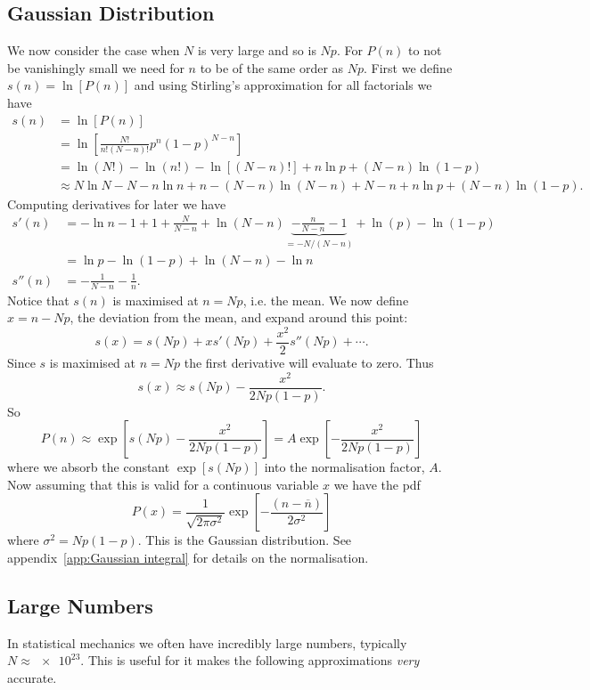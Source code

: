 \documentclass[a4paper]{article}
\newcommand{\mean}[1]{\overline{#1}}
\begin{document}
    \subsection{Gaussian Distribution}
    We now consider the case when \(N\) is very large and so is \(Np\).
    For \(P(n)\) to not be vanishingly small we need for \(n\) to be of the same order as \(Np\).
    First we define \(s(n) = \ln[P(n)]\) and using Stirling's approximation for all factorials we have
    \begin{align*}
        s(n) &= \ln[P(n)]\\
        &= \ln\left[\frac{N!}{n!(N - n)!}p^n(1 - p)^{N-n}\right]\\
        &= \ln(N!) - \ln(n!) - \ln[(N - n)!] + n\ln p + (N - n)\ln(1 - p)\\
        &\approx N\ln N - N - n\ln n + n - (N - n)\ln(N - n) + N - n + n\ln p + (N - n)\ln(1 - p).
    \end{align*}
    Computing derivatives for later we have
    \begin{align*}
        s'(n) &= -\ln n - 1 + 1 + \frac{N}{N - n} + \ln(N - n) \underbrace{- \frac{n}{N - n} - 1}_{= - N/(N-n)} + \ln(p) - \ln(1 - p)\\
        &= \ln p - \ln(1 - p) + \ln(N - n) - \ln n\\
        s''(n) &= -\frac{1}{N - n} - \frac{1}{n}.
    \end{align*}
    Notice that \(s(n)\) is maximised at \(n = Np\), i.e. the mean.
    We now define \(x = n - Np\), the deviation from the mean, and expand around this point:
    \[s(x) = s(Np) + xs'(Np) + \frac{x^2}{2}s''(Np) + \dotsb.\]
    Since \(s\) is maximised at \(n = Np\) the first derivative will evaluate to zero.
    Thus
    \[s(x) \approx s(Np) - \frac{x^2}{2Np(1 - p)}.\]
    So
    \[P(n) \approx \exp\left[s(Np) - \frac{x^2}{2Np(1 - p)}\right] = A\exp\left[-\frac{x^2}{2Np(1 - p)}\right]\]
    where we absorb the constant \(\exp[s(Np)]\) into the normalisation factor, \(A\).
    Now assuming that this is valid for a continuous variable \(x\) we have the \gls{pdf}
    \[P(x) = \frac{1}{\sqrt{2\pi\sigma^2}}\exp\left[-\frac{(n - \mean{n})}{2\sigma^2}\right]\]
    where \(\sigma^2 = Np(1 - p)\).
    This is the Gaussian distribution.
    See appendix~\ref{app:Gaussian integral} for details on the normalisation.
    
    \subsection{Large Numbers}
    In statistical mechanics we often have incredibly large numbers, typically \(N\approx\num{e23}\).
    This is useful for it makes the following approximations \emph{very} accurate.
    
\end{document}
